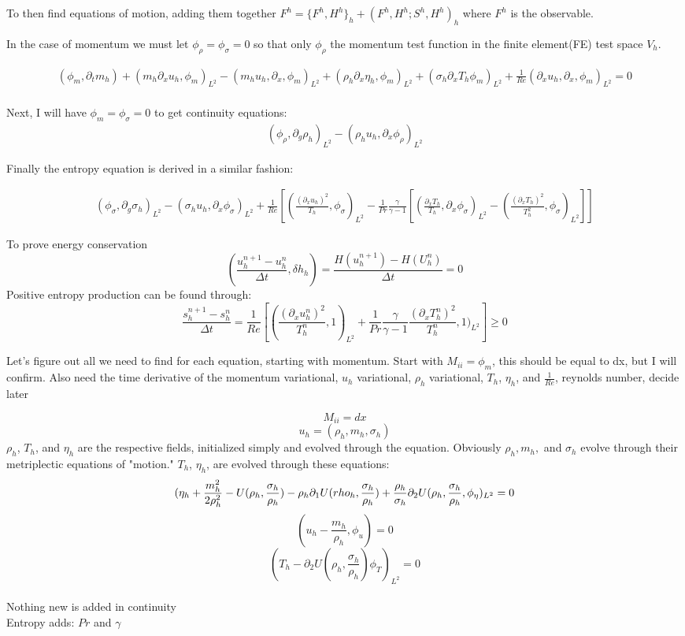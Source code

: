 To then find equations of motion, adding them together $F^h=\{F^h, H^h\}_h+(F^h, H^h; S^h, H^h)_h$ where $F^h$ is the observable. 

In the case of momentum we must let $\phi_\rho = \phi_\sigma = 0$ so that only $\phi_\rho$ the momentum test function in the finite element(FE) test space $V_h$.

\begin{align*}
    (\phi_m, \partial_tm_h) + (m_h\partial_xu_h, \phi_m)_{L^2} - (m_h u_h, \partial_x, \phi_m)_{L^2}
    + (\rho_h \partial_x \eta_h, \phi_m)_{L^2} + (\sigma_h\partial_xT_h \phi_m)_{L^2} +
    \frac{1}{Re}(\partial_xu_h, \partial_x, \phi_m)_{L^2} = 0 
\end{align*}
\\
Next, I will have $\phi_m=\phi_\sigma=0$ to get continuity equations:
\\
\begin{align*}
    (\phi_\rho, \partial_g \rho_h)_{L^2}-(\rho_hu_h, \partial_x \phi_\rho)_{L^2}
\end{align*}

Finally the entropy equation is derived in a similar fashion:

\begin{align*}
    (\phi_\sigma, \partial_g \sigma_h)_{L^2}-(\sigma_h u_h, \partial_x \phi_\sigma)_{L^2}+\frac{1}{Re}[(\frac{(\partial_x u_h)^2}{T_h}, \phi_\sigma)_{L^2}-\frac{1}{Pr}\frac{\gamma}{\gamma-1}[(\frac{\partial_x T_h}{T_h}, \partial_x\phi_\sigma)_{L^2}-(\frac{(\partial_x T_h)^2}{T_h^2}, \phi_\sigma)_{L^2} ]]
\end{align*}

To prove energy conservation
$$(\frac{u^{n+1}_h-u^n_h}{\Delta t}, \delta h_h)=\frac{H(u^{n+1}_h)-H(U^n_h)}{\Delta t} = 0$$
Positive entropy production can be found through:
$$\frac{s^{n+1}_h-s^n_h}{\Delta t} = \frac{1}{Re}[(\frac{(\partial_x u^n_h)^2}{T^n_h},1)_{L^2}+\frac{1}{Pr}\frac{\gamma}{\gamma-1}\frac{(\partial_x T^n_h)^2}{T^n_h},1)_{L^2}]\geq 0$$


Let's figure out all we need to find for each equation, starting with momentum. 
Start with $M_{ii}=\phi_m$, this should be equal to dx, but I will confirm. Also need the time derivative of the momentum variational, $u_h$ variational, $\rho_h$ variational, $T_h$, $\eta_h$, and $\frac{1}{Re}$, reynolds number, decide later

$$M_{ii}=dx$$
$$u_h=(\rho_h, m_h, \sigma_h)$$
$\rho_h$, $T_h$, and $\eta_h$ are the respective fields, initialized simply and evolved through the equation.
Obviously $\rho_h, m_h,$ and $\sigma_h$ evolve through their metriplectic equations of "motion."
$T_h$, $\eta_h$, are evolved through these equations:
$$(\eta_h + \frac{m^2_h}{2\rho^2_h}-U(\rho_h, \frac{\sigma_h}{\rho_h})-\rho_h \partial_1 U(\\rho_h, \frac{\sigma_h}{\rho_h})+\frac{\rho_h}{\sigma_h}\partial_2U(\rho_h, \frac{\sigma_h}{\rho_h}, \phi_\eta)_{L^2}=0$$
$$(u_h-\frac{m_h}{\rho_h},\phi_u)=0$$
$$(T_h-\partial_2U(\rho_h, \frac{\sigma_h}{\rho_h})\phi_T)_{L^2}=0$$
\\
Nothing new is added in continuity
\\
Entropy adds: $Pr$ and $\gamma$
